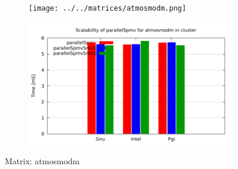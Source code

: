 \begin{figure} [ht!]
    \centering
    \captionsetup{justification=centering, singlelinecheck=false}
    \begin{subfigure}{.65\textwidth}
      \centering
      \hspace*{-3.5cm} 
      \texttt{[image: ../../matrices/atmosmodm.png]}
      \label{fig:atmosmodm_matrix}
    \end{subfigure}%
    \begin{subfigure}{.65\textwidth}
      \centering
      \hspace*{-6.0cm} 
      \includegraphics[page=1, width=0.95\linewidth]{../plots/myCluster_4-2.pdf}
      \label{fig:atmosmodm_performance}
    \end{subfigure}
\caption{Matrix: atmosmodm}
\label{fig:atmosmodm}
\end{figure}

